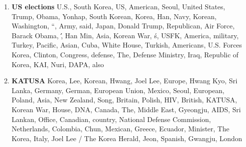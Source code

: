 \begin{enumerate}
  \item \textbf{US elections} U.S., South Korea, US, American, Seoul, United States, Trump, Obama, Yonhap, South Korean, Korea, Han, Navy, Korean, Washington, ``, Army, said, Japan, Donald Trump, Republican, Air Force, Barack Obama, \'\', Han Min, Asia, Korean War, \'s, USFK, America, military, Turkey, Pacific, Asian, Cuba, White House, Turkish, Americans, U.S. Forces Korea, Clinton, Congress, defense, The, Defense Ministry, Iraq, Republic of Korea, KAI, Nuri, DAPA, also
  \item \textbf{KATUSA} Korea, Lee, Korean, Hwang, Joel Lee, Europe, Hwang Kyo, Sri Lanka, Germany, German, European Union, Mexico, Seoul, European, Poland, Asia, New Zealand, Song, Britain, Polish, HIV, British, KATUSA, Korean War, House, DNA, Canada, The, Middle East, Gyeongju, AIDS, Sri Lankan, Office, Canadian, country, National Defense Commission, Netherlands, Colombia, Chun, Mexican, Greece, Ecuador, Minister, The Korea, Italy, Joel Lee / The Korea Herald, Jeon, Spanish, Gwangju, London
\end{enumerate}


